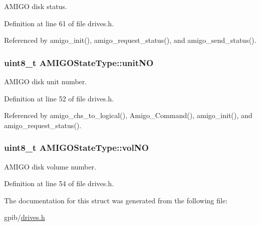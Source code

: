 A\+M\+I\+GO disk status. 



Definition at line 61 of file drives.\+h.



Referenced by amigo\+\_\+init(), amigo\+\_\+request\+\_\+status(), and amigo\+\_\+send\+\_\+status().

\subsubsection[{\texorpdfstring{unit\+NO}{unitNO}}]{\setlength{\rightskip}{0pt plus 5cm}uint8\+\_\+t A\+M\+I\+G\+O\+State\+Type\+::unit\+NO}\hypertarget{structAMIGOStateType_a3d0cc02f8822c817feddf93dd08a5034}{}\label{structAMIGOStateType_a3d0cc02f8822c817feddf93dd08a5034}


A\+M\+I\+GO disk unit number. 



Definition at line 52 of file drives.\+h.



Referenced by amigo\+\_\+chs\+\_\+to\+\_\+logical(), Amigo\+\_\+\+Command(), amigo\+\_\+init(), and amigo\+\_\+request\+\_\+status().

\subsubsection[{\texorpdfstring{vol\+NO}{volNO}}]{\setlength{\rightskip}{0pt plus 5cm}uint8\+\_\+t A\+M\+I\+G\+O\+State\+Type\+::vol\+NO}\hypertarget{structAMIGOStateType_a9825e282ac5844225a43b7f0835da67f}{}\label{structAMIGOStateType_a9825e282ac5844225a43b7f0835da67f}


A\+M\+I\+GO disk volume number. 



Definition at line 54 of file drives.\+h.



The documentation for this struct was generated from the following file\+:\begin{DoxyCompactItemize}
\item 
gpib/\hyperlink{drives_8h}{drives.\+h}\end{DoxyCompactItemize}
